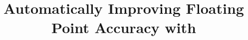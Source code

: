 \documentclass[pageno]{jpaper}
\begin{document}
\title{Automatically Improving Floating Point Accuracy with \casio}
\date{}
\maketitle
\thispagestyle{empty}



















\end{document}

